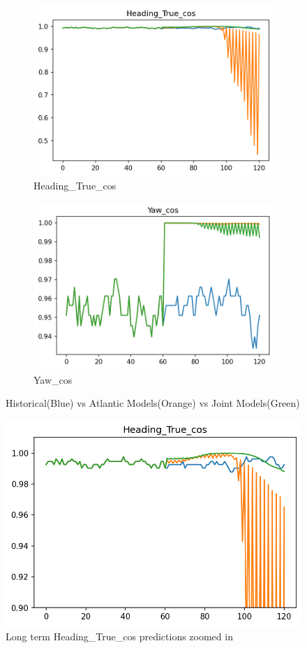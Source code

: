 \documentclass[12pt,twoside]{report}
\begin{document}
\begin{figure}[ht]
\begin{subfigure}[b]{0.32\textwidth}
         \includegraphics[width=\textwidth]{figures/prediction-plots-joint/Heading_True_cos.png}
         \caption{Heading\_True\_cos}
     \end{subfigure}
     \begin{subfigure}[b]{0.32\textwidth}
         \centering
         \includegraphics[width=\textwidth]{figures/prediction-plots-joint/Yaw_cos.png}
         \caption{Yaw\_cos}
     \end{subfigure}
        \caption{Historical(Blue) vs Atlantic Models(Orange) vs Joint Models(Green)}
        \label{fig:prediction-joint}
\end{figure}

\begin{figure}[h]
\centering
\includegraphics[width = 0.5\hsize]{figures/joint-models/Heading_True_cos_zoom.png}
\caption{Long term Heading\_True\_cos predictions zoomed in}
\label{fig:Heading_True_cos_zoom}
\end{figure}
\end{document}
